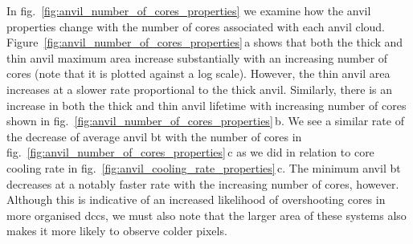 In fig.~\ref{fig:anvil_number_of_cores_properties} we examine how the anvil properties change with the number of cores associated with each anvil cloud.
Figure~\ref{fig:anvil_number_of_cores_properties}\,a shows that both the thick and thin anvil maximum area increase substantially with an increasing number of cores (note that it is plotted against a log scale).
However, the thin anvil area increases at a slower rate proportional to the thick anvil.
Similarly, there is an increase in both the thick and thin anvil lifetime with increasing number of cores shown in fig.~\ref{fig:anvil_number_of_cores_properties}\,b.
We see a similar rate of the decrease of average anvil \acrshort{bt} with the number of cores in fig.~\ref{fig:anvil_number_of_cores_properties}\,c as we did in relation to core cooling rate in fig.~\ref{fig:anvil_cooling_rate_properties}\,c.
The minimum anvil \acrshort{bt} decreases at a notably faster rate with the increasing number of cores, however.
Although this is indicative of an increased likelihood of overshooting cores in more organised \acrshort{dcc}s, we must also note that the larger area of these systems also makes it more likely to observe colder pixels.
